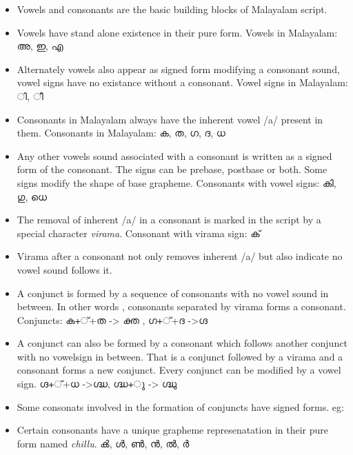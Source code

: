 \documentclass[10pt]{article}
\begin{document}
\begin{itemize}
\item
Vowels and consonants are the basic building blocks of Malayalam script. 
\item
 Vowels have stand alone existence in their pure form. Vowels in Malayalam: \begingroup \manjari അ, ഇ, എ \endgroup
\item
Alternately vowels also appear as signed form modifying a consonant sound, vowel signs have no existance  without a consonant.  Vowel signs in Malayalam: \begingroup \manjari  ി, ീ\endgroup
\item Consonants in Malayalam always have the inherent vowel /a/ present in them. Consonants in Malayalam: \begingroup \manjari  ക, ത, ഗ, ദ, ധ \endgroup
\item
 Any other vowels sound associated with a consonant is written as a signed form of the consonant. The signs can be prebase, postbase or both. Some signs modify the shape of base grapheme. Consonants with vowel signs:   \begingroup \manjari കി, ഗു, ധെ \endgroup 

\item
The removal of inherent /a/ in a consonant is marked in the script by a special character \textit{virama}.  Consonant with virama sign: \begingroup \manjari ക് \endgroup
\item
Virama after a consonant not only removes inherent /a/ but also indicate no vowel sound follows it. 
\item
A conjunct is formed by   a sequence of consonants with no vowel sound in between. In other words , consonants separated by virama forms a consonant. Conjuncts: \begingroup \manjari ക+്+ത -> ക്ത , ഗ+്+ദ ->ഗ്ദ \endgroup
\item
 A conjunct can also be formed by a consonant which follows another conjunct with no vowelsign in between. That is a conjunct followed by a virama and a consonant forms a new conjunct.  Every conjunct can be modified by a vowel sign.  \begingroup \manjari ഗ്ദ+്+ധ ->ഗ്ദ്ധ, ഗ്ദ്ധ+ു -> ഗ്ദ്ധു  \endgroup

\item
Some consonats involved in the formation of conjuncts have signed forms. eg:\begingroup {}\endgroup
  
\item 
Certain consonants have a unique grapheme represenatation in their pure form named \textit{chillu}.  \begingroup \manjari ൿ, ൾ, ൺ, ൻ, ൽ, ർ  \endgroup
\end{itemize}
\end{document}
